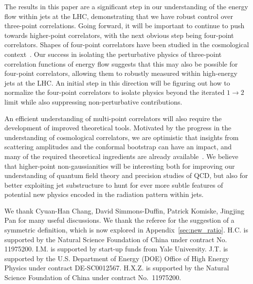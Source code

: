 \documentclass[letterpaper,11pt]{article}
\def\App#1{Appendix~\ref{#1}}
\def\to{\rightarrow}
\DeclareRobustCommand{\App}[1]{App.~\ref{#1}}
\begin{document}
The results in this paper are a significant step in our understanding of the energy flow within jets at the LHC, demonstrating that we have robust control over three-point correlations.
%
Going forward, it will be important to continue to push towards higher-point correlators, with the next obvious step being four-point correlators.
%
Shapes of four-point correlators have been studied in the cosmological context~\cite{Arroja:2009pd,Chen:2009bc,Hindmarsh:2009es,Senatore:2010jy,Bartolo:2010di,Lewis:2011au}.
%
Our success in isolating the perturbative physics of three-point correlation functions of energy flow suggests that this may also be possible for four-point correlators, allowing them to robustly measured within high-energy jets at the LHC.
%
An initial step in this direction will be figuring out how to normalize the four-point correlators to isolate physics beyond the iterated $1 \to 2$ limit while also suppressing non-perturbative contributions.


An efficient understanding of multi-point correlators will also require the development of improved theoretical tools.
%
Motivated by the progress in the understanding of cosmological correlators, we are optimistic that insights from scattering amplitudes and the conformal bootstrap can have an impact, and many of the required theoretical ingredients are already available~\cite{DelDuca:2019ggv,DelDuca:2020vst}.
%
We believe that higher-point non-gaussianities will be interesting both for improving our understanding of quantum field theory and precision studies of QCD, but also for better exploiting jet substructure to hunt for ever more subtle features of potential new physics encoded in the radiation pattern within jets.






\begin{acknowledgments}
	
We thank Cyuan-Han Chang, David Simmons-Duffin, Patrick Komiske, Jingjing Pan for many useful discussions.
%
We thank the referee for the suggestion of a symmetric definition, which is now explored in \App{sec:new_ratio}.
%
H.C. is supported by the Natural Science Foundation of
China under contract No. 11975200.
%
I.M. is supported by start-up funds from Yale University.	
%
J.T. is supported by the U.S. Department of Energy (DOE) Office of High Energy Physics under contract DE-SC0012567.
%
H.X.Z. is supported by the Natural Science Foundation of
China under contract No.~11975200.

\end{acknowledgments}
\end{document}

